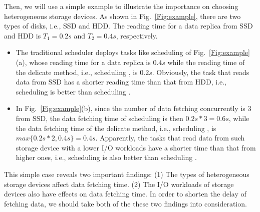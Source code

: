 \documentclass[conference]{IEEEtran}
\begin{document}
Then, we will use a simple example to illustrate the importance on choosing heterogeneous storage devices. As shown in Fig.~\ref{Fig:example}, there are two types of disks, i.e., SSD and HDD. The reading time for a data replica from SSD and HDD is $T_1 = 0.2s$ and $T_2 = 0.4s$, respectively. 
\begin{itemize}
	\item The traditional scheduler deploys tasks like scheduling \uppercase\expandafter{} of Fig.~\ref{Fig:example}(a), whose reading time for a data replica is $0.4s$ while the reading time of the delicate method, i.e., scheduling \uppercase\expandafter{}, is $0.2s$. Obviously, the task that reads data from SSD has a shorter reading time than that from HDD, i.e., scheduling \uppercase\expandafter{} is better than scheduling \uppercase\expandafter{}.

	\item In Fig.~\ref{Fig:example}(b), since the number of data fetching concurrently is 3 from SSD, the data fetching time of scheduling \uppercase\expandafter{} is then $0.2s * 3 = 0.6s$, while the data fetching time of the delicate method, i.e., scheduling \uppercase\expandafter{}, is $max\{0.2s * 2, 0.4s\} = 0.4s$. Apparently, the tasks that read data from such storage device with a lower I/O workloads have a shorter time than that from higher ones, i.e., scheduling \uppercase\expandafter{} is also better than scheduling \uppercase\expandafter{}.
\end{itemize}

This simple case reveals two important findings: (1) The types of heterogeneous storage devices affect data fetching time. (2) The I/O workloads of storage devices also have effects on data fetching time. In order to shorten the delay of fetching data, we should take both of the these two findings into consideration.

\end{document}
